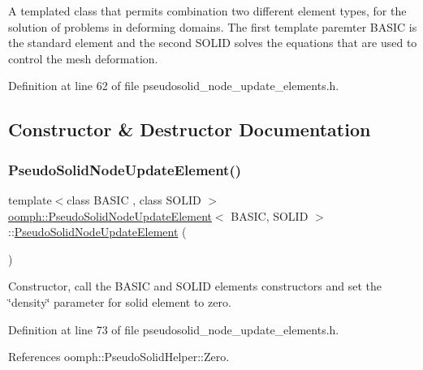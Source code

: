 A templated class that permits combination two different element types, for the solution of problems in deforming domains. The first template paremter B\+A\+S\+IC is the standard element and the second S\+O\+L\+ID solves the equations that are used to control the mesh deformation. 

Definition at line 62 of file pseudosolid\+\_\+node\+\_\+update\+\_\+elements.\+h.



\subsection{Constructor \& Destructor Documentation}
\mbox{\label{classoomph_1_1PseudoSolidNodeUpdateElement_afd44332410c5956938614b5899f85cb8}} 
\subsubsection{\texorpdfstring{Pseudo\+Solid\+Node\+Update\+Element()}{PseudoSolidNodeUpdateElement()}}
{\footnotesize\ttfamily template$<$class B\+A\+S\+IC , class S\+O\+L\+ID $>$ \\
\hyperlink{classoomph_1_1PseudoSolidNodeUpdateElement}{oomph\+::\+Pseudo\+Solid\+Node\+Update\+Element}$<$ B\+A\+S\+IC, S\+O\+L\+ID $>$\+::\hyperlink{classoomph_1_1PseudoSolidNodeUpdateElement}{Pseudo\+Solid\+Node\+Update\+Element} (\begin{DoxyParamCaption}{ }\end{DoxyParamCaption})\hspace{0.3cm}{\ttfamily [inline]}}



Constructor, call the B\+A\+S\+IC and S\+O\+L\+ID elements\textquotesingle{} constructors and set the \char`\"{}density\char`\"{} parameter for solid element to zero. 



Definition at line 73 of file pseudosolid\+\_\+node\+\_\+update\+\_\+elements.\+h.



References oomph\+::\+Pseudo\+Solid\+Helper\+::\+Zero.



